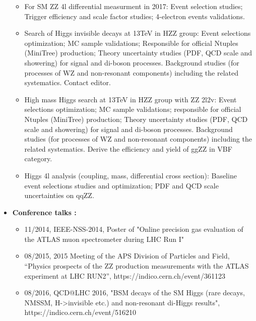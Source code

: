 \begin{itemize}
\begin{itemize}
      \item For SM ZZ 4l differential measurment in 2017: Event selection studies; Trigger efficiency and scale factor studies;
      4-electron events validations.

      \item Search of Higgs invisible decays at 13TeV in HZZ group: Event selections optimization; MC sample validations; 
       Responsible for official Ntuples (MiniTree) production; Theory uncertainty studies (PDF, QCD scale and showering)
       for signal and di-boson processes. Background studies (for processes of WZ and non-resonant components) including the 
       related systematics. Contact editor. 

      \item High mass Higgs search at 13TeV in HZZ group with ZZ 2l2v: Event selections optimization; MC sample validations;
       responsible for official Ntuples (MiniTree) production; Theory uncertainty studies (PDF, QCD scale and showering)
       for signal and di-boson processes. Background studies (for processes of WZ and non-resonant components) including the
       related systematics. Derive the efficiency and yield of ggZZ in VBF category. 

      \item Higgs 4l analysis (coupling, mass, differential cross section): Baseline event selections studies and optimization;
       PDF and QCD scale uncertainties on qqZZ. 

    \end{itemize}

\item \textbf{Conference talks :}

    \begin{itemize}
        \item 11/2014, IEEE-NSS-2014, Poster of "Online precision gas evaluation of the ATLAS muon 
              spectrometer during LHC Run I"
        \item 08/2015, 2015 Meeting of the APS Division of Particles and Field, 
            ``Physics prospects of the ZZ production measurements with the ATLAS experiment at LHC RUN2'', 
            https://indico.cern.ch/event/361123
        \item 08/2016, QCD@LHC 2016, "BSM decays of the SM Higgs (rare decays, NMSSM, H->invisible etc.) and 
            non-resonant di-Higgs results", https://indico.cern.ch/event/516210
    \end{itemize}


\end{itemize}
